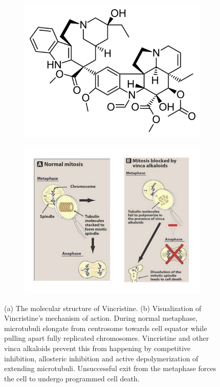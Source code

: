 \documentclass[pdftex,12pt,a4paper]{report}
\begin{document}
\begin{figure}[H]
\centering
\begin{subfigure}{.4\textwidth}
  \centering
  \includegraphics[width=\textwidth]{images/vincristine}
  \caption{}
  \label{fig:vincristine}
\end{subfigure}
\centering
\begin{subfigure}{.9\textwidth}
  \centering
  \includegraphics[width=.8\textwidth]{images/vincristine_mechanism}
  \caption{}
  \label{fig:vinchristine_mechanism}
\end{subfigure}
\caption[The structure and mechanism of Vincristine]{(a) The molecular structure of Vincristine. (b) Visualization of Vincristine's mechanism of action. During normal metaphase, microtubuli elongate from centrosome towards cell equator while pulling apart fully replicated chromosomes. Vincristine and other vinca alkaloids prevent this from happening by competitive inhibition, allosteric inhibition and active depolymerization of extending microtubuli. Unsuccessful exit from the metaphase forces the cell to undergo programmed cell death.}
\label{fig:vincs}
\end{figure}
\end{document}
